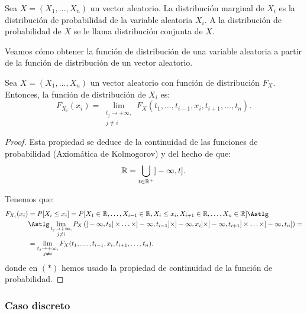 \begin{definicion}
    Sea $X=(X_1, \ldots, X_n)$ un vector aleatorio. La distribución marginal de $X_i$ es la distribución de probabilidad de la variable aleatoria $X_i$. A la distribución de probabilidad de $X$ se le llama distribución conjunta de $X$.
\end{definicion}

Veamos cómo obtener la función de distribución de una variable aleatoria a partir de la función de distribución de un vector aleatorio.
\begin{prop}
    Sea $X=(X_1, \ldots, X_n)$ un vector aleatorio con función de distribución $F_X$. Entonces, la función de distribución de $X_i$ es:
    \begin{equation*}
        F_{X_i}(x_i) = \lim_{\substack{t_j\to +\infty,\\j\neq i}} F_X(t_1, \ldots, t_{i-1}, x_i, t_{i+1}, \ldots, t_n).
    \end{equation*}
\end{prop}
\begin{proof}
    Esta propiedad se deduce de la continuidad de las funciones de probabilidad (Axiomática de Kolmogorov) y del hecho de que:
    \begin{equation*}
        \mathbb{R} = \bigcup_{t\in \mathbb{R}^+} ]-\infty, t].
    \end{equation*}

    Tenemos que:
    \begin{align*}
        F_{X_i}(x_i) &= P[X_i\leq x_i] = P[X_1\in \bb{R}, \ldots, X_{i-1}\in \bb{R}, X_i\leq x_i, X_{i+1}\in \bb{R}, \ldots, X_n\in \bb{R}] \AstIg\\
        &\AstIg
        \lim_{\substack{t_j\to +\infty,\\j\neq i}}
        P_X\left(]-\infty, t_1]\times \ldots \times  ]-\infty, t_{i-1}]\times ]-\infty, x_i] \times ]-\infty, t_{i+1}] \times \ldots \times ]-\infty, t_n]\right) =\\
        &= \lim_{\substack{t_j\to +\infty,\\j\neq i}} F_X(t_1, \ldots, t_{i-1}, x_i, t_{i+1}, \ldots, t_n).
    \end{align*}
    donde en $(\ast)$ hemos usado la propiedad de continuidad de la función de probabilidad.
\end{proof}

\subsubsection{Caso discreto}

